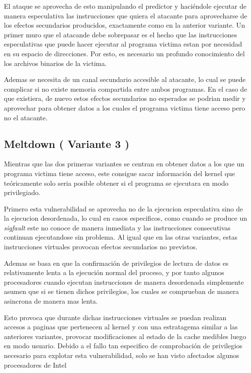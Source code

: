 \documentclass[paper=a4, fontsize=11pt]{scrartcl} %
\begin{document}
El ataque se aprovecha de esto manipulando el predictor y haciéndole ejecutar de manera especulativa las instrucciones que quiera el atacante para aprovecharse de los efectos secundarios producidos, exactamente como en la anterior variante. Un primer muro que el atacande debe sobrepasar es el hecho que las instrucciones especulativas que puede hacer ejecutar al programa victima estan por necesidad en su espacio de direcciones.
Por esto, es necesario un profundo conocimiento del los archivos binarios de la victima.

Ademas se necesita de un canal secundario accesible al atacante, lo cual se puede complicar si no existe memoria compartida entre ambos programas. En el caso de que existiera, de nuevo estos efectos secundarios no esperados se podrian medir y aprovechar para obtener datos a los cuales el programa victima tiene acceso pero no el atacante\cite{spectre}.


\subsection{Meltdown\cite{meltdown} ( Variante 3 ) }

Mientras que las dos primeras variantes se centran en obtener datos a los que un programa victima tiene acceso, este consigue sacar información del kernel que teóricamente solo seria posible obtener si el programa se ejecutara en modo privilegiado. 

Primero esta vulnerabilidad se aprovecha no de la ejecucion especulativa sino de la ejecucion desordenada, lo cual en casos especificos, como cuando se produce un \textit{sigfault} este no conoce de manera inmediata y las instrucciones consecutivas continuan ejecutandose sin problema. Al igual que en las otras variantes, estas instrucciones virtuales provocan efectos secundarios no previstos.

Ademas se basa en que la confirmación de privilegios de lectura de datos es relativamente lenta a la ejecución normal del proceso, y por tanto algunos procesadores cuando ejecutan instrucciones de manera desordenada simplemente asumen que si se tienen dichos privilegios, los cuales se comprueban de manera asincrona de manera mas lenta.

Esto provoca que durante dichas instrucciones virtuales se puedan realizan accesos a paginas que pertenecen al kernel y con una estratagema similar a las anteriores variantes, provocar modificaciones al estado de la cache medibles luego en modo usuario.
Debido a el fallo tan especifico de comprobación de privilegios necesario para explotar esta vulnerabilidad, solo se han visto afectados algunos procesadores de Intel
\end{document}
